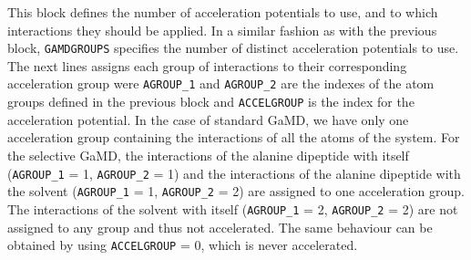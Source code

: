 This block defines the number of acceleration potentials to use, and to which interactions they should be applied.
In a similar fashion as with the previous block, \texttt{GAMDGROUPS} specifies the number of distinct acceleration potentials to use. 
The next lines assigns each group of interactions to their corresponding acceleration group were \texttt{AGROUP\_1} and \texttt{AGROUP\_2}  are the indexes of the atom groups defined in the previous block and \texttt{ACCELGROUP} is the index for the acceleration potential. 
In the case of standard GaMD, we have only one acceleration group containing the interactions of all the atoms of the system. For the selective GaMD, the interactions of the alanine dipeptide with itself (\texttt{AGROUP\_1} = 1, \texttt{AGROUP\_2} = 1) and the interactions of the alanine dipeptide with the solvent (\texttt{AGROUP\_1} = 1, \texttt{AGROUP\_2} = 2) are assigned to one acceleration group. The interactions of the solvent with itself (\texttt{AGROUP\_1} = 2, \texttt{AGROUP\_2} = 2) are not assigned to any group and thus not accelerated. The same behaviour can be obtained by using \texttt{ACCELGROUP} = 0, which is never accelerated.

